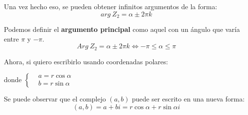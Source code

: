 \documentclass[12pt, twocolumn]{article}
\begin{document}
Una vez hecho eso, se pueden obtener infinitos argumentos de la forma:
$$arg \ Z_{2}=\alpha \pm 2\pi k$$

Podemos definir el \textbf{argumento principal} como aquel con un ángulo que varía entre $\pi$ y $-\pi$.
$$Arg \ Z_{2}=\alpha \pm 2\pi k \Leftrightarrow -\pi\leq\alpha\leq\pi$$

Ahora, si quiero escribirlo usando coordenadas polares:
\begin{center}
\end{center}
donde $\left\{
\begin{aligned}
    &a=r\cos{\alpha}\\
    &b=r\sin{\alpha}
\end{aligned}
\right.$

Se puede observar que el complejo $(a,b)$ puede ser escrito en una nueva forma:
$$(a,b)=a+bi=\boxed{r\cos{\alpha}+r\sin{\alpha}i}$$
\end{document}
